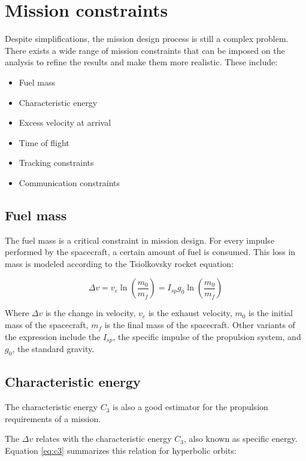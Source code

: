 \section{Mission constraints}

Despite simplifications, the mission design process is still a complex problem.
There exists a wide range of mission constraints that can be imposed on the analysis
to refine the results and make them more realistic. These include:

\begin{itemize}
    \item Fuel mass
    \item Characteristic energy
    \item Excess velocity at arrival
    \item Time of flight
    \item Tracking constraints
    \item Communication constraints
\end{itemize}

\subsection{Fuel mass}

The fuel mass is a critical constraint in mission design. For every impulse
performed by the spacecraft, a certain amount of fuel is consumed. This loss in
mass is modeled according to the Tsiolkovsky rocket equation:

\begin{equation}
        \Delta v = v_e \ln \left( \frac{m_0}{m_f} \right) = I_{sp} g_0 \ln \left( \frac{m_0}{m_f} \right)
        \label{eq:tsiolkovsky}
\end{equation}

Where $\Delta v$ is the change in velocity, $v_e$ is the exhaust velocity, $m_0$
is the initial mass of the spacecraft, $m_f$ is the final mass of the
spacecraft. Other variants of the expression include the $I_{sp}$, the specific
impulse of the propulsion system, and $g_0$, the standard gravity.

\subsection{Characteristic energy}

The characteristic energy $C_3$ is also a good estimator for the propulsion
requirements of a mission.

The $\Delta v$ relates with the characteristic energy $C_3$, also known as
specific energy. Equation \ref{eq:c3} summarizes this relation for hyperbolic
orbits:

